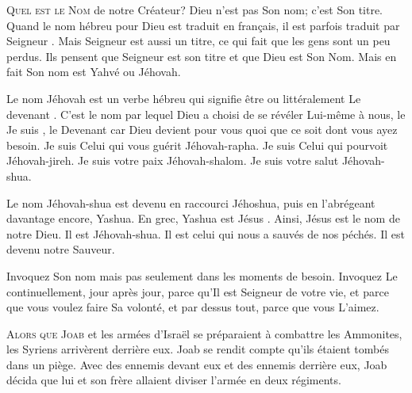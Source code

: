\lettrine{Q}{uel est le Nom} de notre Créateur?
 \og Dieu \fg{} n'est pas Son nom; c'est Son titre.
 Quand le nom hébreu pour Dieu est traduit en français,
 il est parfois traduit par \og Seigneur \fg{}.
 Mais \og Seigneur \fg{} est aussi un titre,
 ce qui fait que les gens sont un peu perdus.
 Ils pensent que \og Seigneur \fg{} est son titre
 et que \og Dieu \fg{} est Son Nom.
 Mais en fait Son nom est Yahvé ou Jéhovah. 

Le nom Jéhovah est un verbe hébreu qui signifie \og être \fg{}
 ou littéralement \og Le devenant \fg{}.
 C'est le nom par lequel Dieu a choisi de se révéler Lui-même à nous,
 le \og Je suis \fg{}, le \og Devenant \fg{} car Dieu devient pour vous
 quoi que ce soit dont vous ayez besoin.
 Je suis Celui qui vous guérit \ocadr Jéhovah-rapha.
 Je suis Celui qui pourvoit \ocadr Jéhovah-jireh.
 Je suis votre paix \ocadr Jéhovah-shalom.
 Je suis votre salut \ocadr Jéhovah-shua. 

Le nom Jéhovah-shua est devenu en raccourci Jéhoshua,
 puis en l'abrégeant davantage encore, Yashua.
 En grec, Yashua est \og Jésus \fg{}.
 Ainsi, Jésus est le nom de notre Dieu. Il est Jéhovah-shua.
 Il est celui qui nous a sauvés de nos péchés. Il est devenu notre Sauveur.


Invoquez Son nom \ocadr mais pas seulement dans les moments de besoin.
 Invoquez Le continuellement, jour après jour, parce qu'Il est Seigneur
 de votre vie, et parce que vous voulez faire Sa volonté, et par dessus
 tout, parce que vous L'aimez.

\dvrule






\lettrine{A}{lors que Joab} et les armées d'Israël se préparaient
 à combattre les Ammonites, les Syriens arrivèrent derrière eux.
 Joab se rendit compte qu'ils étaient tombés dans un piège.
 Avec des ennemis devant eux et des ennemis derrière eux,
 Joab décida que lui et son frère allaient diviser
 l'armée en deux régiments. 

